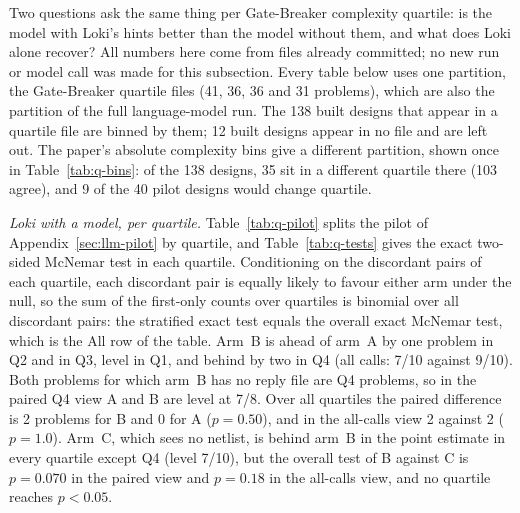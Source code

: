 \documentclass[conference]{IEEEtran}
\begin{document}

Two questions ask the
same thing per Gate-Breaker complexity quartile: is the model with Loki's hints better than the
model without them, and what does Loki alone recover? All numbers here come from files already
committed; no new run or model call was made for this subsection. Every table below uses one
partition, the Gate-Breaker quartile files (41, 36, 36 and 31 problems), which are also the
partition of the full language-model run. The 138 built designs that appear in a quartile file
are binned by them; 12 built designs appear in no file and are left out. The paper's absolute
complexity bins give a different partition, shown once in Table~\ref{tab:q-bins}: of the 138
designs, 35 sit in a different quartile there (103 agree), and 9 of the 40 pilot designs would
change quartile.

\emph{Loki with a model, per quartile.} Table~\ref{tab:q-pilot} splits the pilot of
Appendix~\ref{sec:llm-pilot} by quartile, and Table~\ref{tab:q-tests} gives the exact two-sided
McNemar test in each quartile. Conditioning on the discordant pairs of each quartile, each
discordant pair is equally likely to favour either arm under the null, so the sum of the
first-only counts over quartiles is binomial over all discordant pairs: the stratified exact
test equals the overall exact McNemar test, which is the All row of the table. Arm~B is ahead of
arm~A by one problem in Q2 and in Q3, level in Q1, and behind by two in Q4 (all calls: 7/10
against 9/10). Both problems for which arm~B has no reply file are Q4 problems, so in the paired
Q4 view A and B are level at 7/8. Over all quartiles the paired difference is 2 problems for B
and 0 for A ($p=0.50$), and in the all-calls view 2 against 2 ($p=1.0$). Arm~C, which sees no
netlist, is behind arm~B in the point estimate in every quartile except Q4 (level 7/10), but the
overall test of B against C is $p=0.070$ in the paired view and $p=0.18$ in the all-calls view,
and no quartile reaches $p<0.05$.
\end{document}
